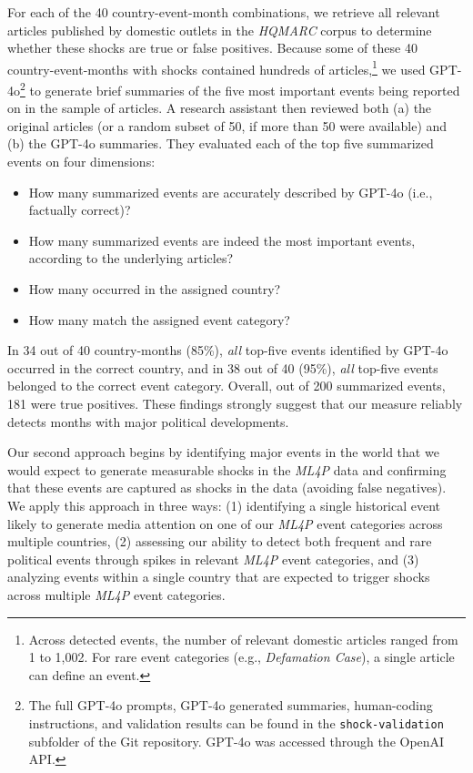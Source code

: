 \documentclass[
  letterpaper,
  DIV=11,
  numbers=noendperiod]{scrartcl}
\providecommand{\tightlist}{%
  \setlength{\itemsep}{0pt}\setlength{\parskip}{0pt}}\usepackage{longtable,booktabs,array}
\begin{document}
For each of the 40 country-event-month combinations, we retrieve all
relevant articles published by domestic outlets in the \emph{HQMARC}
corpus to determine whether these shocks are true or false positives.
Because some of these 40 country-event-months with shocks contained
hundreds of articles,\footnote{Across detected events, the number of
  relevant domestic articles ranged from 1 to 1,002. For rare event
  categories (e.g., \emph{Defamation Case}), a single article can define
  an event.} we used GPT-4o\footnote{The full GPT-4o prompts, GPT-4o
  generated summaries, human-coding instructions, and validation results
  can be found in the \texttt{shock-validation} subfolder of the Git
  repository. GPT-4o was accessed through the OpenAI API.} to generate
brief summaries of the five most important events being reported on in
the sample of articles. A research assistant then reviewed both (a) the
original articles (or a random subset of 50, if more than 50 were
available) and (b) the GPT-4o summaries. They evaluated each of the top
five summarized events on four dimensions:

\begin{itemize}
\tightlist
\item
  How many summarized events are accurately described by GPT-4o (i.e.,
  factually correct)?
\item
  How many summarized events are indeed the most important events,
  according to the underlying articles?
\item
  How many occurred in the assigned country?
\item
  How many match the assigned event category?
\end{itemize}

In 34 out of 40 country-months (85\%), \emph{all} top-five events
identified by GPT-4o occurred in the correct country, and in 38 out of
40 (95\%), \emph{all} top-five events belonged to the correct event
category. Overall, out of 200 summarized events, 181 were true
positives. These findings strongly suggest that our measure reliably
detects months with major political developments.

Our second approach begins by identifying major events in the world that
we would expect to generate measurable shocks in the \emph{ML4P} data
and confirming that these events are captured as shocks in the data
(avoiding false negatives). We apply this approach in three ways: (1)
identifying a single historical event likely to generate media attention
on one of our \emph{ML4P} event categories across multiple countries,
(2) assessing our ability to detect both frequent and rare political
events through spikes in relevant \emph{ML4P} event categories, and (3)
analyzing events within a single country that are expected to trigger
shocks across multiple \emph{ML4P} event categories.
\end{document}
